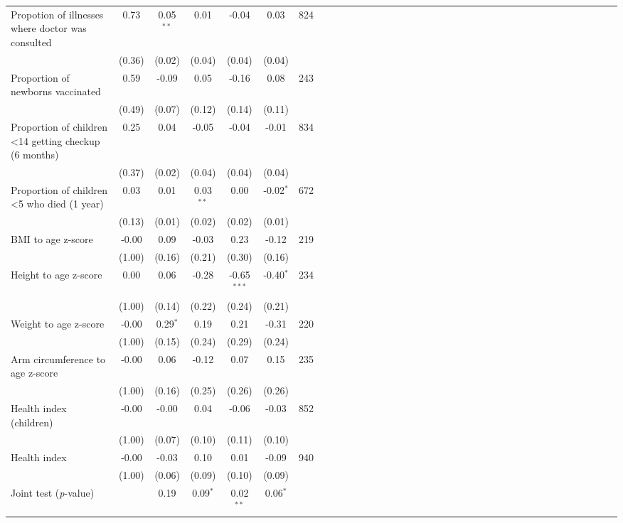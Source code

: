 {\begin{tabular}{l*{6}{SSSSSc}}
Propotion of illnesses where doctor was consulted&     0.73&0.05$^{**}$&     0.01&    -0.04&     0.03&      824\\
          &   (0.36)&   (0.02)&   (0.04)&   (0.04)&   (0.04)&         \\
Proportion of newborns vaccinated&     0.59&    -0.09&     0.05&    -0.16&     0.08&      243\\
          &   (0.49)&   (0.07)&   (0.12)&   (0.14)&   (0.11)&         \\
Proportion of children <14 getting checkup (6 months)&     0.25&     0.04&    -0.05&    -0.04&    -0.01&      834\\
          &   (0.37)&   (0.02)&   (0.04)&   (0.04)&   (0.04)&         \\
Proportion of children <5 who died (1 year)&     0.03&     0.01&0.03$^{**}$&     0.00&-0.02$^{*}$&      672\\
          &   (0.13)&   (0.01)&   (0.02)&   (0.02)&   (0.01)&         \\
BMI to age z-score&    -0.00&     0.09&    -0.03&     0.23&    -0.12&      219\\
          &   (1.00)&   (0.16)&   (0.21)&   (0.30)&   (0.16)&         \\
Height to age z-score&     0.00&     0.06&    -0.28&-0.65$^{***}$&-0.40$^{*}$&      234\\
          &   (1.00)&   (0.14)&   (0.22)&   (0.24)&   (0.21)&         \\
Weight to age z-score&    -0.00&0.29$^{*}$&     0.19&     0.21&    -0.31&      220\\
          &   (1.00)&   (0.15)&   (0.24)&   (0.29)&   (0.24)&         \\
Arm circumference to age z-score&    -0.00&     0.06&    -0.12&     0.07&     0.15&      235\\
          &   (1.00)&   (0.16)&   (0.25)&   (0.26)&   (0.26)&         \\
Health index (children)&    -0.00&    -0.00&     0.04&    -0.06&    -0.03&      852\\
          &   (1.00)&   (0.07)&   (0.10)&   (0.11)&   (0.10)&         \\
Health index&    -0.00&    -0.03&     0.10&     0.01&    -0.09&      940\\
          &   (1.00)&   (0.06)&   (0.09)&   (0.10)&   (0.09)&         \\
\midrule Joint test (\emph{p}-value)&         &     0.19&0.09$^{*}$&0.02$^{**}$&0.06$^{*}$&         \\
\bottomrule
\end{tabular}
}

